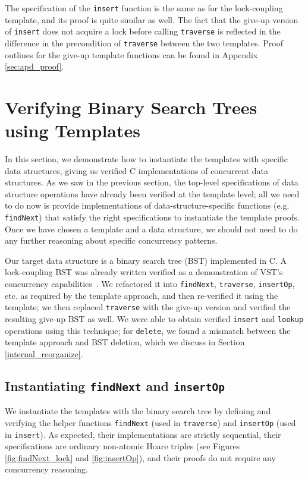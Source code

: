 \documentclass[sigplan,10pt, screen]{acmart}
\begin{document}
The specification of the \lstinline{insert} function is the same as for the lock-coupling template, and its proof is quite similar as well. The fact that the give-up version of \lstinline{insert} does not acquire a lock before calling \lstinline{traverse} is reflected in the difference in the precondition of \lstinline{traverse} between the two templates. Proof outlines for the give-up template functions can be found in Appendix \ref{sec:apd_proof}.

\section{Verifying Binary Search Trees using Templates}
\label{BST_proof}
In this section, we demonstrate how to instantiate the templates with specific data structures, giving us verified C implementations of concurrent data structures. 
As we saw in the previous section, the top-level specifications of data structure operations have already been verified at the template level; all we need to do now is provide implementations of data-structure-specific functions (e.g. \lstinline{findNext}) that satisfy the right specifications to instantiate the template proofs. Once we have chosen a template and a data structure, we should not need to do any further reasoning about specific concurrency patterns.

Our target data structure is a binary search tree (BST) implemented in C. A lock-coupling BST was already written verified as a demonstration of VST's concurrency capabilities~\cite{bst-conc}. We refactored it into \lstinline{findNext}, \lstinline{traverse}, \lstinline{insertOp}, etc. as required by the template approach, and then re-verified it using the template; we then replaced \lstinline{traverse} with the give-up version and verified the resulting give-up BST as well. We were able to obtain verified \lstinline{insert} and \lstinline{lookup} operations using this technique; for \texttt{delete}, we found a mismatch between the template approach and BST deletion, which we discuss in Section \ref{internal_reorganize}.

\subsection{Instantiating \lstinline{findNext} and \lstinline{insertOp}}
We instantiate the templates with the binary search tree by defining and verifying the helper functions \texttt{findNext} (used in \lstinline{traverse}) and \texttt{insertOp} (used in \texttt{insert}). As expected, their implementations are strictly sequential, their specifications are ordinary non-atomic Hoare triples (see Figures \ref{fig:findNext_lock} and \ref{fig:insertOp}), and their proofs do not require any concurrency reasoning.
\end{document}
